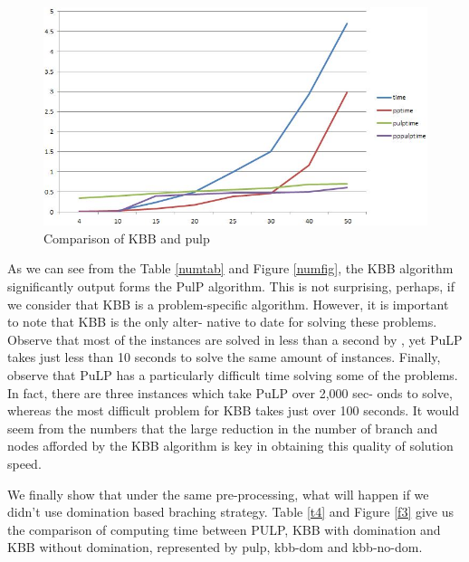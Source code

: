 \documentclass[a4paper,11pt]{article}
\begin{document}
\begin{figure}[H]
\begin{center}
\includegraphics[scale=0.6]{3}
\end{center}
\caption{Comparison of KBB and pulp \label{numfigp}}
\end{figure}

As we can see from the Table \ref{numtab} and Figure \ref{numfig}, the KBB algorithm significantly output forms the PulP algorithm. This is not surprising, perhaps, if we consider that KBB is a problem-specific algorithm. However, it is important to note that KBB is the only alter- native to date for solving these problems. Observe that most of the instances are solved in less than a second by , yet PuLP takes just less than 10 seconds to solve the same amount of instances. Finally, observe that PuLP has a particularly difficult time solving some of the problems. In fact, there are three instances which take PuLP over 2,000 sec- onds to solve, whereas the most difficult problem for KBB takes just over 100 seconds. It would seem from the numbers that the large reduction in the number of branch and nodes afforded by the KBB algorithm is key in obtaining this quality of solution speed.

We finally show that under the same pre-processing, what will happen if we didn't use domination based braching strategy. Table \ref{t4} and Figure \ref{f3} give us the comparison of computing time between PULP, KBB with domination and KBB without domination, represented by pulp, kbb-dom and kbb-no-dom.
\end{document}
